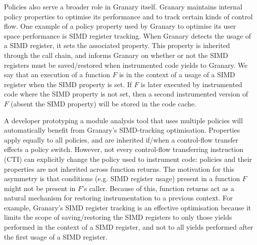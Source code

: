 \documentclass[letterpaper,twocolumn,10pt]{article}
\begin{document}
Policies also serve a broader role in Granary itself. Granary maintains internal policy properties to optimise its performance and to track certain kinds of control flow. One example of a policy property used by Granary to optimise its user space performance is SIMD register tracking. When Granary detects the usage of a SIMD register, it sets the associated property. This property is inherited through the call chain, and informs Granary on whether or not the SIMD registers must be saved/restored when instrumented code yields to Granary. We say that an execution of a function $F$ is in the context of a usage of a SIMD register when the SIMD property is set. If $F$ is later executed by instrumented code where the SIMD property is not set, then a second instrumented version of $F$ (absent the SIMD property) will be stored in the code cache.

A developer prototyping a module analysis tool that uses multiple policies will automatically benefit from Granary's SIMD-tracking optimisation. Properties apply equally to all policies, and are inherited if/when a control-flow transfer effects a policy switch. However, not every control-flow transferring instruction (CTI) can explicitly change the policy used to instrument code: policies and their properties are not inherited across function returns. The motivation for this asymmetry is that conditions (e.g. SIMD register usage) present in a function $F$ might not be present in $F$'s caller. Because of this, function returns act as a natural mechanism for restoring instrumentation to a previous context. For example, Granary's SIMD register tracking is an effective optimisation because it limits the scope of saving/restoring the SIMD registers to only those yields performed in the context of a SIMD register, and not to all yields performed after the first usage of a SIMD register.


\end{document}
